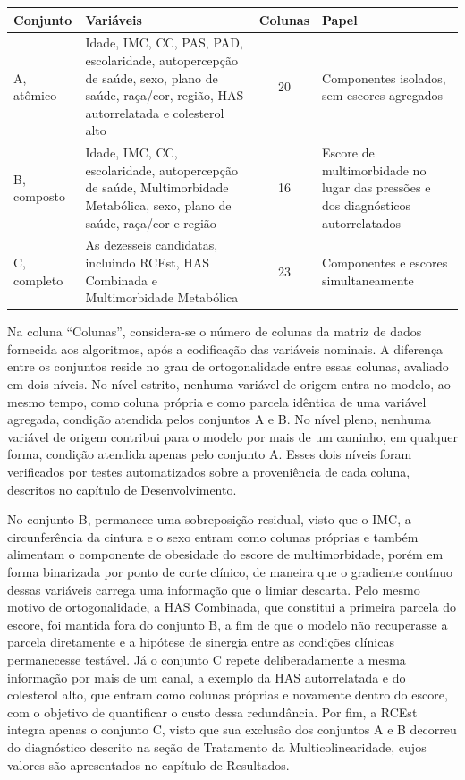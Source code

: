 \begin{quadro}[htb]
  \caption{\label{qua:conjuntos}Conjuntos de atributos avaliados.}
  \small
  \begin{tabular}{|p{2.2cm}|p{6.2cm}|c|p{4.2cm}|}
    \hline
    \textbf{Conjunto} & \textbf{Variáveis} & \textbf{Colunas} & \textbf{Papel} \\ \hline
    A, atômico & Idade, IMC, CC, PAS, PAD, escolaridade, autopercepção de saúde, sexo, plano de saúde, raça/cor, região, HAS autorrelatada e colesterol alto & 20 & Componentes isolados, sem escores agregados \\ \hline
    B, composto & Idade, IMC, CC, escolaridade, autopercepção de saúde, Multimorbidade Metabólica, sexo, plano de saúde, raça/cor e região & 16 & Escore de multimorbidade no lugar das pressões e dos diagnósticos autorrelatados \\ \hline
    C, completo & As dezesseis candidatas, incluindo RCEst, HAS Combinada e Multimorbidade Metabólica & 23 & Componentes e escores simultaneamente \\ \hline
  \end{tabular}
\end{quadro}

Na coluna ``Colunas'', considera-se o número de colunas da matriz de dados fornecida aos algoritmos, após a codificação das variáveis nominais. A diferença entre os conjuntos reside no grau de ortogonalidade entre essas colunas, avaliado em dois níveis. No nível estrito, nenhuma variável de origem entra no modelo, ao mesmo tempo, como coluna própria e como parcela idêntica de uma variável agregada, condição atendida pelos conjuntos A e B. No nível pleno, nenhuma variável de origem contribui para o modelo por mais de um caminho, em qualquer forma, condição atendida apenas pelo conjunto A. Esses dois níveis foram verificados por testes automatizados sobre a proveniência de cada coluna, descritos no capítulo de Desenvolvimento.

No conjunto B, permanece uma sobreposição residual, visto que o IMC, a circunferência da cintura e o sexo entram como colunas próprias e também alimentam o componente de obesidade do escore de multimorbidade, porém em forma binarizada por ponto de corte clínico, de maneira que o gradiente contínuo dessas variáveis carrega uma informação que o limiar descarta. Pelo mesmo motivo de ortogonalidade, a HAS Combinada, que constitui a primeira parcela do escore, foi mantida fora do conjunto B, a fim de que o modelo não recuperasse a parcela diretamente e a hipótese de sinergia entre as condições clínicas permanecesse testável. Já o conjunto C repete deliberadamente a mesma informação por mais de um canal, a exemplo da HAS autorrelatada e do colesterol alto, que entram como colunas próprias e novamente dentro do escore, com o objetivo de quantificar o custo dessa redundância. Por fim, a RCEst integra apenas o conjunto C, visto que sua exclusão dos conjuntos A e B decorreu do diagnóstico descrito na seção de Tratamento da Multicolinearidade, cujos valores são apresentados no capítulo de Resultados.

